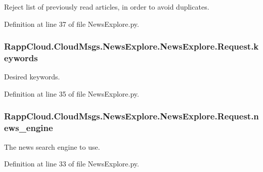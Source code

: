 Reject list of previously read articles, in order to avoid duplicates. 



Definition at line 37 of file News\-Explore.\-py.

\hypertarget{classRappCloud_1_1CloudMsgs_1_1NewsExplore_1_1NewsExplore_1_1Request_ade6c237ad31bc5b55bb627a9f7499d71}{
\subsubsection[{keywords}]{\setlength{\rightskip}{0pt plus 5cm}Rapp\-Cloud.\-Cloud\-Msgs.\-News\-Explore.\-News\-Explore.\-Request.\-keywords}}\label{classRappCloud_1_1CloudMsgs_1_1NewsExplore_1_1NewsExplore_1_1Request_ade6c237ad31bc5b55bb627a9f7499d71}


Desired keywords. 



Definition at line 35 of file News\-Explore.\-py.

\hypertarget{classRappCloud_1_1CloudMsgs_1_1NewsExplore_1_1NewsExplore_1_1Request_a1c42e1e823d2825802ec924b569b0e4a}{
\subsubsection[{news\-\_\-engine}]{\setlength{\rightskip}{0pt plus 5cm}Rapp\-Cloud.\-Cloud\-Msgs.\-News\-Explore.\-News\-Explore.\-Request.\-news\-\_\-engine}}\label{classRappCloud_1_1CloudMsgs_1_1NewsExplore_1_1NewsExplore_1_1Request_a1c42e1e823d2825802ec924b569b0e4a}


The news search engine to use. 



Definition at line 33 of file News\-Explore.\-py.


